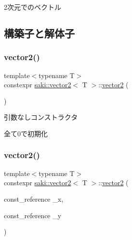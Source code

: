 2次元でのベクトル 

\subsection{構築子と解体子}
\mbox{\label{classsaki_1_1vector2_a30a12a2e1e15cf3a41d33e7f3829aade}} 
\subsubsection{\texorpdfstring{vector2()}{vector2()}\hspace{0.1cm}{\footnotesize\ttfamily [1/4]}}
{\footnotesize\ttfamily template$<$typename T$>$ \\
constexpr \mbox{\hyperlink{classsaki_1_1vector2}{saki\+::vector2}}$<$ T $>$\+::\mbox{\hyperlink{classsaki_1_1vector2}{vector2}} (\begin{DoxyParamCaption}{ }\end{DoxyParamCaption})\hspace{0.3cm}{\ttfamily [inline]}}



引数なしコンストラクタ 

全て0で初期化 \mbox{\label{classsaki_1_1vector2_a28a39f7c69d7fd6393d498065cc51c00}} 
\subsubsection{\texorpdfstring{vector2()}{vector2()}\hspace{0.1cm}{\footnotesize\ttfamily [2/4]}}
{\footnotesize\ttfamily template$<$typename T$>$ \\
constexpr \mbox{\hyperlink{classsaki_1_1vector2}{saki\+::vector2}}$<$ T $>$\+::\mbox{\hyperlink{classsaki_1_1vector2}{vector2}} (\begin{DoxyParamCaption}\item[{const\+\_\+reference}]{\+\_\+x,  }\item[{const\+\_\+reference}]{\+\_\+y }\end{DoxyParamCaption})\hspace{0.3cm}{\ttfamily [inline]}}



